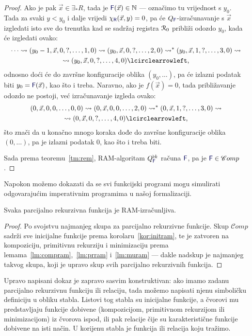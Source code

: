 \begin{proof}
Ako je pak $\vec x\in\exists_*R$, tada je $\f F(\vec x)\in\N$ --- označimo tu vrijednost s $y_0$. Tada za svaki $y<y_0$ i dalje vrijedi $\chi_{\f R}(\vec x,y)=0$, pa će $Q_{\f F}$-izračunavanje s $\vec x$ izgledati isto sve do trenutka kad se sadržaj registra $\mathcal R_{0}$ približi odozdo $y_0$, kada će izgledati ovako:
\begin{multline}
    \dotsb\leadsto(y_0-1,\vec x,0,?,\dotsc,1,0)\leadsto
    (y_0,\vec x,0,?,\dotsc,2,0)\leadsto^*
    (y_0,\vec x,1,?,\dotsc,3,0)\leadsto\\
    \leadsto(y_0,\vec x,0,?,\dotsc,4,0)\lcirclearrowleft\text,
\end{multline}
odnosno doći će do završne konfiguracije oblika $(y_0,\dotsc)$, pa će izlazni podatak biti $y_0=\f F(\vec x)$, kao što i treba. Naravno, ako je $f(\vec x)=0$, tada približavanje odozdo ne postoji, već izračunavanje izgleda ovako:
\begin{multline}
    (0,\vec x,0,0,\dotsc,0,0)\leadsto
    (0,\vec x,0,0,\dotsc,2,0)\leadsto^*
    (0,\vec x,1,?,\dotsc,3,0)\leadsto\\
    \leadsto(0,\vec x,0,?,\dotsc,4,0)\lcirclearrowleft\text,
\end{multline}
što znači da u konačno mnogo koraka dođe do završne konfiguracije oblika $(0,\dotsc)$, pa je izlazni podatak $0$, kao što i treba biti.

    Sada prema teoremu~\ref{tm:rem}, RAM-algoritam $Q_{\f F}^{\flat k}$ računa $\f F$, pa je $\f F\in\mathscr Comp$.
\end{proof}

Napokon možemo dokazati da se svi funkcijski programi mogu simulirati odgovarajućim imperativnim programima u našoj formalizaciji.

\begin{teorem}[{name=[RAM-izračunljivost parcijalno rekurzivnih funkcija]}]\label{tm:pir}
Svaka parcijalno rekurzivna funkcija je RAM-izračunljiva.
\end{teorem}
\begin{proof}
Po svojstvu najmanjeg skupa za parcijalno rekurzivne funkcije. Skup $\mathscr Comp$ sadrži sve inicijalne funkcije prema korolaru~\ref{kor:initram}, te je zatvoren na kompoziciju, primitivnu rekurziju i minimizaciju prema lemama~\ref{lm:compram},~\ref{lm:prram} i~\ref{lm:muram} --- dakle nadskup je najmanjeg takvog skupa, koji je upravo skup svih parcijalno rekurzivnih funkcija.
\end{proof}

Upravo napisani dokaz je zapravo sasvim konstruktivan: ako imamo zadanu parcijalno rekurzivnu funkciju ili relaciju, tada možemo napisati njenu simboličku definiciju u obliku stabla. Listovi tog stabla su inicijalne funkcije, a čvorovi mu predstavljaju funkcije dobivene (kompozicijom, primitivnom rekurzijom ili minimizacijom) iz čvorova ispod, ili pak relacije čije su karakteristične funkcije dobivene na isti način. U korijenu stabla je funkcija ili relacija koju tražimo.

